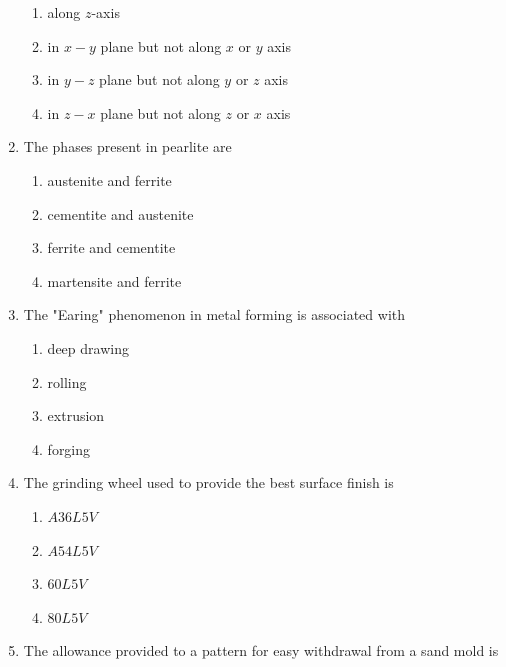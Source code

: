 \documentclass[journal]{IEEEtran}
\begin{document}
\begin{enumerate}
\begin{figure}[h!]
\end{figure}
\begin{enumerate}
    \item along $z$-axis\\
    \item in $x-y$ plane but not along $x$ or $y$ axis\\
    \item in $y-z$ plane but not along $y$ or $z$ axis\\
    \item in $z-x$ plane but not along $z$ or $x$ axis
\end{enumerate}
\item The phases present in pearlite are\\
\begin{enumerate}
    \item austenite and ferrite\\
    \item cementite and austenite\\
    \item ferrite and cementite\\
    \item martensite and ferrite
\end{enumerate}
\item The "Earing" phenomenon in metal forming is associated with\\
\begin{enumerate}
    \item deep drawing\\
    \item rolling\\
    \item extrusion\\
    \item forging
\end{enumerate}
\item The grinding wheel used to provide the best surface finish is\\
\begin{enumerate}
   \item $A36L5V$\\
    \item $A54L5V$\\
    \item $60L5V$\\
   \item $80L5V$
\end{enumerate}
\item The allowance provided to a pattern for easy withdrawal from a sand mold is\\

\end{enumerate}
\end{document}
